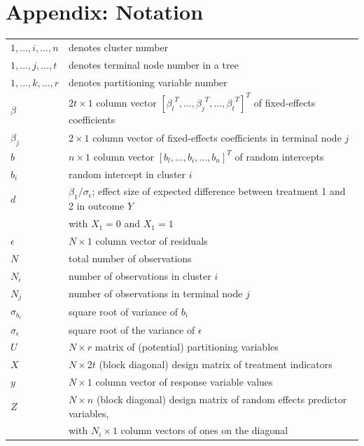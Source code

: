 \documentclass[nobf,man]{apa}
\begin{document}




\section{Appendix: Notation}

\begin{table}
\begin{tabular}{ll}
$1,...,i,...,n$	&	denotes cluster number \\
$1,...,j,...,t$ &	denotes terminal node number in a tree \\
$1,...,k,...,r$ &   denotes partitioning variable number \\
$\beta$ 		&	$2t \times 1$ column vector ${\left[ {\beta_l}^T,...,{\beta_j}^T,...,{\beta_t}^T \right]}^T$ of fixed-effects coefficients \\
$\beta_{j}$		& 	$2 \times 1$ column vector of fixed-effects coefficients in terminal node $j$ \\
$b$ 			&	$n \times 1$ column vector ${\left[ {b_l},...,{b_i},...,{b_n} \right]}^T$ of random intercepts \\
$b_{i}$ 		&	random intercept in cluster $i$\\
$d$				&	$\beta_1 / \sigma_{\epsilon}$; effect size of expected difference between treatment 1 and 2 in outcome $Y$\\
				&	with $X_1 = 0$ and $X_1 = 1$\\
$\epsilon$ 		&	$N \times 1$ column vector of residuals \\
$N$ 			&	total number of observations \\
$N_{i}$ 		&	number of observations in cluster $i$ \\
$N_{j}$			&	number of observations in terminal node $j$ \\
$\sigma_{b_i}$	&	square root of variance of $b_i$\\
$\sigma_{\epsilon}$&square root of the variance of $\epsilon$\\
$U$ 			&	$N \times r$ matrix of (potential) partitioning variables \\
$X$ 			&	$N \times 2t$ (block diagonal) design matrix of treatment indicators\\
$y$ 			&	$N \times 1$ column vector of response variable values \\
$Z$ 			&	$N \times n$ (block diagonal) design matrix of random effects predictor variables, \\
				&	with $N_i \times 1$ column vectors of ones on the diagonal \\
\end{tabular}
\end{table} 
\end{document}
